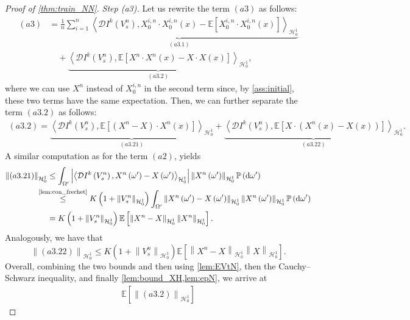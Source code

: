 \documentclass[11pt,a4paper,reqno]{amsart}
\numberwithin{equation}{section}
\theoremstyle{plain}
\theoremstyle{definition}
\def\ud{\mathrm d}
\newcommand{\ip}[1]{\left\langle#1\right\rangle}
\newcommand{\p}{\mathbb{P}}
\newcommand{\E}{\mathbb{E}}
\newcommand{\cH}{\mathcal{H}}
\newcommand{\norm}[1]{\left\|#1 \right\|} %
\newcommand{\abs}[1]{\left|#1\right|} %
\begin{document}
\begin{proof}[Proof of \cref{thm:train_NN}]
\noindent\textit {Step (a3).}
Let us rewrite the term $\left(a3\right)$ as follows:
\begin{align*}
\left(a3\right)
    &= \underbrace{\frac{1}{n}\sum_{i=1}^n \ip{\mathcal{D}I^k \left( V^n_s \right), X^{i,n}_0\cdot X^{i,n}_0\left(x\right)-\E\left[X^{i,n}_0\cdot X^{i,n}_0\left(x\right)\right]}_{\cH_0^1}}_{\left(a3.1\right)}\\
    &\quad+ \underbrace{\ip{\mathcal{D}I^k \left( V^n_s \right), \E\left[X^{n}\cdot X^{n}\left(x\right)-X\cdot X\left(x\right)\right]}_{\cH_0^1}}_{\left(a3.2\right)},
\end{align*}
where we can use $X^n $ instead of $X^{i,n}_0$ in the second term since, by \cref{ass:initial}, these two terms have the same expectation.
Then, we can further separate the term $\left(a3.2\right)$ as follows:
\begin{align*}
\left(a3.2\right)
    = \underbrace{\ip{\mathcal{D}I^k \left( V^n_s \right), \E\left[\left(X^n-X\right)\cdot X^n\left(x\right)\right]}_{\cH_0^1}}_{\left(a3.21\right)}
    +\underbrace{\ip{\mathcal{D}I^k \left( V^n_s \right), \E\left[X \cdot \left( X^n\left(x\right)-X\left(x\right) \right)\right]}_{\cH_0^1}}_{\left(a3.22\right)}.
\end{align*}
A similar computation as for the term $(a2)$, yields
\begin{align*}
\norm{\left(a3.21\right)}_{\cH_0^1}
    &\le \int_{\Omega'}\abs{\ip{ \mathcal{D}I^k \left( V^n_s \right), X^n\left(\omega'\right)-X\left(\omega'\right)}_{\cH_0^1}}\norm{ X^n\left(\omega'\right)}_{\cH_0^1} \p \left( \ud \omega' \right) \\
    &\hspace{-1.35em}\overset{\text{\cref{lem:con_frechet}}}{\le} K \left( 1 + \norm{V_s^n}_{\cH_0^1} \right) \int_{\Omega'} \norm{ X^n \left( \omega' \right) -X \left( \omega' \right)}_{\cH_0^1} \norm{ X^n \left( \omega' \right)}_{\cH_0^1} \p \left( \ud \omega' \right) \\
    &= K \left( 1 + \norm{V_s^n}_{\cH_0^1} \right) \E \left[ \norm{ X^n - X}_{\cH_0^1} \norm{X^n}_{\cH_0^1} \right]. 
\end{align*}
Analogously, we have that
\[
    \norm{\left(a3.22\right)}_{\cH_0^1} \le K \left( 1 + \norm{V_s^n}_{\cH_0^1} \right) \E \left[ \norm{X^n - X}_{\cH_0^1} \norm{X}_{\cH_0^1} \right].
\]
Overall, combining the two bounds and then using \cref{lem:EVtN}, then the Cauchy--Schwarz inequality, and finally \cref{lem:bound_XH,lem:epN}, we arrive at
\begin{align*}
\E\left[\norm{\left(a3.2\right)}_{\cH_0^1}\right] 

\end{align*}
\end{proof}
\end{document}
